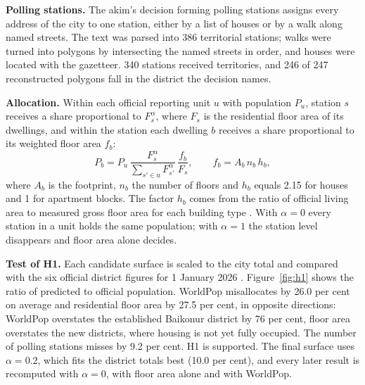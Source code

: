 \textbf{Polling stations.} The akim's decision forming polling stations \cite{pollingstations2025} assigns every address of the city to one station, either by a list of houses or by a walk along named streets. The text was parsed into 386 territorial stations; walks were turned into polygons by intersecting the named streets in order, and houses were located with the gazetteer. 340 stations received territories, and 246 of 247 reconstructed polygons fall in the district the decision names.

\textbf{Allocation.} Within each official reporting unit $u$ with population $P_u$, station $s$ receives a share proportional to $F_s^{\alpha}$, where $F_s$ is the residential floor area of its dwellings, and within the station each dwelling $b$ receives a share proportional to its weighted floor area $f_b$:
\begin{equation}
P_b = P_u \, \frac{F_s^{\alpha}}{\sum_{s' \in u} F_{s'}^{\alpha}} \, \frac{f_b}{F_s}, \qquad f_b = A_b \, n_b \, h_b,
\label{eq:allocation}
\end{equation}
where $A_b$ is the footprint, $n_b$ the number of floors and $h_b$ equals 2.15 for houses and 1 for apartment blocks. The factor $h_b$ comes from the ratio of official living area to measured gross floor area for each building type \cite{statconstruction2026}. With $\alpha = 0$ every station in a unit holds the same population; with $\alpha = 1$ the station level disappears and floor area alone decides.

\textbf{Test of H1.} Each candidate surface is scaled to the city total and compared with the six official district figures for 1 January 2026 \cite{statages2026}. Figure~\ref{fig:h1} shows the ratio of predicted to official population. WorldPop misallocates by 26.0 per cent on average and residential floor area by 27.5 per cent, in opposite directions: WorldPop overstates the established Baikonur district by 76 per cent, floor area overstates the new districts, where housing is not yet fully occupied. The number of polling stations misses by 9.2 per cent. H1 is supported. The final surface uses $\alpha = 0.2$, which fits the district totals best (10.0 per cent), and every later result is recomputed with $\alpha = 0$, with floor area alone and with WorldPop.

